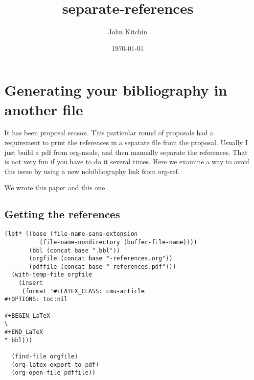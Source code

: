 \documentclass{article}
\author{John Kitchin}
\date{\today}
\title{separate-references}
\begin{document}
\tableofcontents

\section{Generating your bibliography in another file}
\label{sec-1}

It has been proposal season. This particular round of proposals had a requirement to print the references in a separate file from the proposal. Usually I just build a pdf from org-mode, and then manually separate the references. That is not very fun if you have to do it several times. Here we examine a way to avoid this issue by using a new nobibliography link from org-ref.

We wrote this paper \cite{mehta-2014-ident-poten} and this one \cite{xu-2014-relat}.




\subsection{Getting the references}
\label{sec-1-1}


\begin{verbatim}
(let* ((base (file-name-sans-extension
	      (file-name-nondirectory (buffer-file-name))))
       (bbl (concat base ".bbl"))
       (orgfile (concat base "-references.org"))
       (pdffile (concat base "-references.pdf")))
  (with-temp-file orgfile
    (insert 
     (format "#+LATEX_CLASS: cmu-article
#+OPTIONS: toc:nil

#+BEGIN_LaTeX
\
#+END_LaTeX
" bbl)))

  (find-file orgfile)
  (org-latex-export-to-pdf)
  (org-open-file pdffile))
\end{verbatim}
\end{document}
